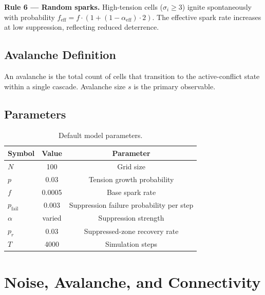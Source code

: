 \documentclass[12pt,a4paper]{article}
\begin{document}
\textbf{Rule 6 --- Random sparks.}
High-tension cells ($\sigma_i \ge 3$) ignite spontaneously with probability
$f_{\text{eff}} = f\cdot(1 + (1-\alpha_{\text{eff}})\cdot 2)$. The effective spark
rate increases at low suppression, reflecting reduced deterrence.

\subsection{Avalanche Definition}

An avalanche is the total count of cells that transition to the active-conflict state
within a single cascade. Avalanche size $s$ is the primary observable.

\subsection{Parameters}

\begin{table}[h!]
\centering
\caption{Default model parameters.}
\label{tab:params}
\begin{tabular}{lcc}
\toprule
\textbf{Symbol} & \textbf{Value} & \textbf{Parameter}                          \\
\midrule
$N$             & 100            & Grid size                                   \\
$p$             & 0.03           & Tension growth probability                  \\
$f$             & 0.0005         & Base spark rate                             \\
$p_{\text{fail}}$ & 0.003        & Suppression failure probability per step    \\
$\alpha$        & varied         & Suppression strength                        \\
$p_r$           & 0.03           & Suppressed-zone recovery rate               \\
$T$             & 4000           & Simulation steps                            \\
\bottomrule
\end{tabular}
\end{table}

\section{Noise, Avalanche, and Connectivity}
\end{document}
